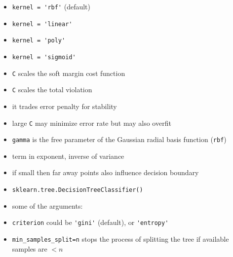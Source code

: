 \documentclass[onecolumn]{IEEEtran} %
\begin{document}
\begin{itemize}
            \bi
                \item \verb|kernel = 'rbf'| (default)
                \item \verb|kernel = 'linear'|
                \item \verb|kernel = 'poly'|
                \item \verb|kernel = 'sigmoid'|
            \ei
            \item \verb|C| scales the soft margin cost function
            \bi
                \item \verb|C| scales the total violation
                \item it trades error penalty for stability
                \item large \verb|C| may minimize error rate but may also overfit
            \ei
            \item \verb|gamma| is the free parameter of the Gaussian radial basis  function (\verb|rbf|)
            \bi
                \item term in exponent, inverse of variance
                \item if small then far away points also influence decision boundary
            \ei
        \ei
    \ei
    \item \verb|sklearn.tree.DecisionTreeClassifier()|
    \bi
        \item some of the arguments:
        \bi
            \item \verb|criterion| could be \verb|'gini'| (default), or \verb|'entropy'|
            \item \verb|min_samples_split=n| stops the process of splitting the tree if available samples are $<n$
        \ei
    \ei
\end{itemize}


\newpage
\end{document}
